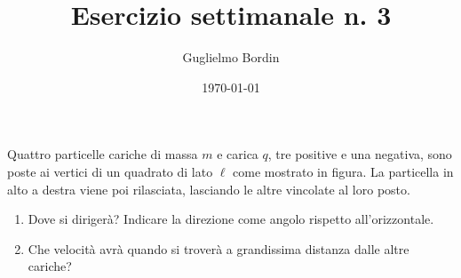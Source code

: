 \documentclass[10pt]{gulartcl}
\title{Esercizio settimanale n. 3}
\author{Guglielmo Bordin}
\date{\today}
\begin{document}
\maketitle
    
\noindent
Quattro particelle cariche di massa $m$ e carica $q$, tre positive e una
negativa, sono poste ai vertici di un quadrato di lato $\ell$ come mostrato
in figura. La particella in alto a destra viene poi rilasciata, lasciando
le altre vincolate al loro posto. 
\begin{enumerate}
    \item Dove si dirigerà? Indicare la direzione come angolo rispetto
        all’orizzontale.
    \item Che velocità avrà quando si troverà a grandissima distanza dalle
        altre cariche?
\end{enumerate}

\bigbreak
\begin{center}
\end{center}
\end{document}
